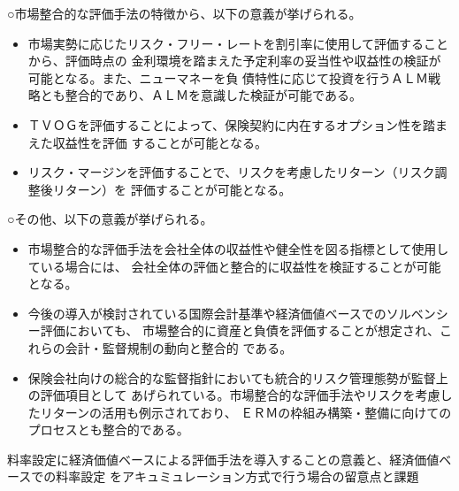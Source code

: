 \documentclass[report,gutter=10mm,fore-edge=10mm,uplatex,dvipdfmx]{jlreq}
\begin{document}
○市場整合的な評価手法の特徴から、以下の意義が挙げられる。
\begin{itemize}
 \item 市場実勢に応じたリスク・フリー・レートを割引率に使用して評価することから、評価時点の
金利環境を踏まえた予定利率の妥当性や収益性の検証が可能となる。また、ニューマネーを負
債特性に応じて投資を行うＡＬＭ戦略とも整合的であり、ＡＬＭを意識した検証が可能である。
 \item ＴＶＯＧを評価することによって、保険契約に内在するオプション性を踏まえた収益性を評価
することが可能となる。
 \item リスク・マージンを評価することで、リスクを考慮したリターン（リスク調整後リターン）を
評価することが可能となる。
\end{itemize}
○その他、以下の意義が挙げられる。
\begin{itemize}
 \item 市場整合的な評価手法を会社全体の収益性や健全性を図る指標として使用している場合には、
会社全体の評価と整合的に収益性を検証することが可能となる。
 \item 今後の導入が検討されている国際会計基準や経済価値ベースでのソルベンシー評価においても、
市場整合的に資産と負債を評価することが想定され、これらの会計・監督規制の動向と整合的
である。
 \item 保険会社向けの総合的な監督指針においても統合的リスク管理態勢が監督上の評価項目として
あげられている。市場整合的な評価手法やリスクを考慮したリターンの活用も例示されており、
ＥＲＭの枠組み構築・整備に向けてのプロセスとも整合的である。
\end{itemize}

料率設定に経済価値ベースによる評価手法を導入することの意義と、経済価値ベースでの料率設定
をアキュミュレーション方式で行う場合の留意点と課題
\end{document}
